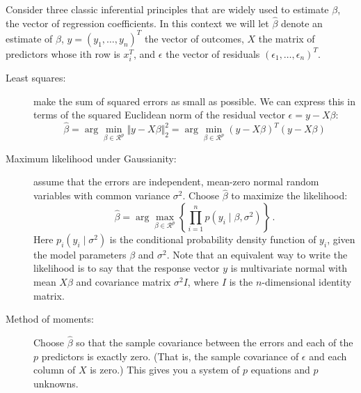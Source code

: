 \documentclass[11pt]{article}
\begin{document}
Consider three classic inferential principles that are widely used to estimate $\beta$, the vector of regression coefficients.  In this context we will let $\hat{\beta}$ denote an estimate of $\beta$, $y = (y_1, \ldots, y_n)^T$ the vector of outcomes, $X$ the matrix of predictors whose ith row is $x_i^T$, and $\epsilon$ the vector of residuals $(\epsilon_1, \ldots, \epsilon_n)^T$.  
 
\begin{description}
\item[Least squares:] make the sum of squared errors as small as possible.  We can express this in terms of the squared Euclidean norm of the residual vector $\epsilon = y - X \beta$:  
$$
\hat{\beta} = \arg \min_{\beta \in \mathcal{R}^p} \Vert y - X\beta \Vert_2^2 =  \arg \min_{\beta \in \mathcal{R}^p} (y - X\beta)^T (y-X \beta)
$$
\item[Maximum likelihood under Gaussianity:] assume that the errors are independent, mean-zero normal random variables with common variance $\sigma^2$.  Choose $\hat{\beta}$ to maximize the likelihood:
$$
\hat{\beta} = \arg \max_{\beta \in \mathcal{R}^p} \left\{ \prod_{i=1}^n p(y_i \mid \beta, \sigma^2) \right\} \, .
$$
Here $p_i(y_i \mid \sigma^2)$ is the conditional probability density function of $y_i$, given the model parameters $\beta$ and $\sigma^2$.  Note that an equivalent way to write the likelihood is to say that the response vector $y$ is multivariate normal with mean $X \beta$ and covariance matrix $\sigma^2 I$, where $I$ is the $n$-dimensional identity matrix.  

\item[Method of moments:] Choose $\hat{\beta}$ so that the sample covariance between the errors and each of the $p$ predictors is exactly zero.  (That is, the sample covariance of $\epsilon$ and each column of $X$ is zero.)  This gives you a system of $p$ equations and $p$ unknowns.
\end{description}
\end{document}
